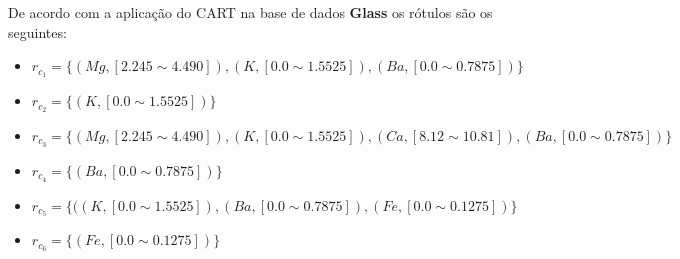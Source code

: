 De acordo com a aplicação do CART na base de dados \textbf{Glass} os rótulos são os seguintes:
\begin{itemize}[noitemsep]
 \item ${r_{c_1}=\{ (Mg, [ 2.245 \sim 4.490 ]), (K,[ 0.0 \sim 1.5525 ] ), (Ba,[ 0.0 \sim 0.7875 ] ) \} }$  
 \item ${r_{c_2}=\{ (K,[ 0.0 \sim 1.5525 ] ) \} }$
 \item ${r_{c_3}=\{ (Mg, [ 2.245 \sim 4.490 ]), (K,[ 0.0 \sim 1.5525 ] ), (Ca,[ 8.12 \sim 10.81 ] ), (Ba,[ 0.0 \sim 0.7875 ] ) \} }$  
 \item ${r_{c_4}=\{ (Ba,[ 0.0 \sim 0.7875 ] ) \} }$
 \item ${r_{c_5}=\{ ( (K,[ 0.0 \sim 1.5525 ] ), (Ba,[ 0.0 \sim 0.7875 ] ), (Fe,[ 0.0 \sim 0.1275 ] ) \} }$
 \item ${r_{c_6}=\{ (Fe,[ 0.0 \sim 0.1275 ] ) \} }$
\end{itemize}



